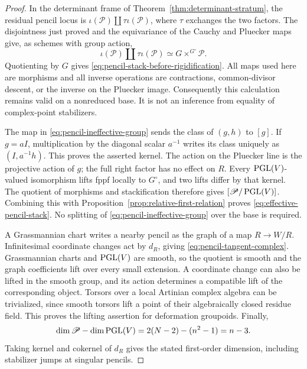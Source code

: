 \documentclass[11pt,reqno]{amsart}
\numberwithin{equation}{section}
\theoremstyle{definition}\newtheorem{definition}[theorem]{Definition}
\theoremstyle{remark}\newtheorem{remark}[theorem]{Remark}
\begin{document}
\begin{proof}
In the determinant frame of
Theorem~\ref{thm:determinant-stratum}, the residual pencil locus is
\(\iota(\mathscr P)\amalg\tau\iota(\mathscr P)\), where
\(\tau\) exchanges the two factors.  The disjointness just proved
and the equivariance of the Cauchy and Pluecker maps give, as
schemes with group action,
\[
 \iota(\mathscr P)\amalg\tau\iota(\mathscr P)
                         \simeq G\times^{G^\circ}\mathscr P.
\]
Quotienting by \(G\) gives
\eqref{eq:pencil-stack-before-rigidification}.  All maps used here
are morphisms and all inverse operations are contractions,
common-divisor descent, or the inverse on the Pluecker image.
Consequently this calculation remains valid on a nonreduced base.
It is not an inference from equality of complex-point stabilizers.

The map in \eqref{eq:pencil-ineffective-group} sends the class of
\((g,h)\) to \([g]\).  If \(g=aI\), multiplication by the diagonal
scalar \(a^{-1}\) writes its class uniquely as \((I,a^{-1}h)\).
This proves the asserted kernel.  The action on the Pluecker line
is the projective action of \(g\); the full right factor has no
effect on \(R\).  Every \(\operatorname{PGL}(V)\)-valued isomorphism lifts fppf
locally to \(G^\circ\), and two lifts differ by that kernel.
The quotient of morphisms and stackification therefore gives
\([\mathscr P/\operatorname{PGL}(V)]\).  Combining this with
Proposition~\ref{prop:relative-first-relation} proves
\eqref{eq:effective-pencil-stack}.  No splitting of
\eqref{eq:pencil-ineffective-group} over the base is required.

A Grassmannian chart writes a nearby pencil as the graph of a map
\(R\to W/R\).  Infinitesimal coordinate changes act by \(d_R\),
giving \eqref{eq:pencil-tangent-complex}.  Grassmannian charts and
\(\operatorname{PGL}(V)\) are smooth, so the quotient is smooth and the graph
coefficients lift over every small extension.  A coordinate change
can also be lifted in the smooth group, and its action determines
a compatible lift of the corresponding object.  Torsors over a local
Artinian complex algebra can be trivialized, since smooth torsors
lift a point of their algebraically closed residue field.
This proves the lifting assertion for deformation groupoids.
Finally,
\[
 \dim\mathscr P-\dim\operatorname{PGL}(V)=2(N-2)-(n^2-1)=n-3.
\]
Taking kernel and cokernel of \(d_R\) gives the stated first-order
dimension, including stabilizer jumps at singular pencils.
\end{proof}
\end{document}

